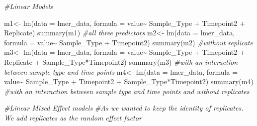 \documentclass[
]{article}
\newenvironment{Shaded}{\begin{snugshade}}{\end{snugshade}}
\newcommand{\AttributeTok}[1]{\textcolor[rgb]{0.77,0.63,0.00}{#1}}
\newcommand{\CommentTok}[1]{\textcolor[rgb]{0.56,0.35,0.01}{\textit{#1}}}
\newcommand{\FunctionTok}[1]{\textcolor[rgb]{0.00,0.00,0.00}{#1}}
\newcommand{\NormalTok}[1]{#1}
\newcommand{\OtherTok}[1]{\textcolor[rgb]{0.56,0.35,0.01}{#1}}
\newcommand{\SpecialCharTok}[1]{\textcolor[rgb]{0.00,0.00,0.00}{#1}}
\begin{document}
\begin{Shaded}
\begin{Highlighting}[]
\CommentTok{\#Linear Models}

\NormalTok{m1}\OtherTok{\textless{}{-}} \FunctionTok{lm}\NormalTok{(}\AttributeTok{data =}\NormalTok{ lmer\_data, }\AttributeTok{formula =}\NormalTok{ value}\SpecialCharTok{\textasciitilde{}}\NormalTok{ Sample\_Type }\SpecialCharTok{+}\NormalTok{ Timepoint2 }\SpecialCharTok{+}\NormalTok{ Replicate)}
\FunctionTok{summary}\NormalTok{(m1)  }\CommentTok{\#all three predictors}
\NormalTok{m2}\OtherTok{\textless{}{-}} \FunctionTok{lm}\NormalTok{(}\AttributeTok{data =}\NormalTok{ lmer\_data, }\AttributeTok{formula =}\NormalTok{ value}\SpecialCharTok{\textasciitilde{}}\NormalTok{ Sample\_Type }\SpecialCharTok{+}\NormalTok{ Timepoint2)}
\FunctionTok{summary}\NormalTok{(m2) }\CommentTok{\#without replicate}
\NormalTok{m3}\OtherTok{\textless{}{-}} \FunctionTok{lm}\NormalTok{(}\AttributeTok{data =}\NormalTok{ lmer\_data, }\AttributeTok{formula =}\NormalTok{ value}\SpecialCharTok{\textasciitilde{}}\NormalTok{ Sample\_Type }\SpecialCharTok{+}\NormalTok{ Timepoint2 }\SpecialCharTok{+}\NormalTok{ Replicate }\SpecialCharTok{+}\NormalTok{ Sample\_Type}\SpecialCharTok{*}\NormalTok{Timepoint2)}
\FunctionTok{summary}\NormalTok{(m3) }\CommentTok{\#with an interaction between sample type and time points}
\NormalTok{m4}\OtherTok{\textless{}{-}} \FunctionTok{lm}\NormalTok{(}\AttributeTok{data =}\NormalTok{ lmer\_data, }\AttributeTok{formula =}\NormalTok{ value}\SpecialCharTok{\textasciitilde{}}\NormalTok{ Sample\_Type }\SpecialCharTok{+}\NormalTok{ Timepoint2 }\SpecialCharTok{+}\NormalTok{  Sample\_Type}\SpecialCharTok{*}\NormalTok{Timepoint2)}
\FunctionTok{summary}\NormalTok{(m4) }\CommentTok{\#with an interaction between sample type and time points and without replicates}

\CommentTok{\#Linear Mixed Effect models}
\CommentTok{\#As we wanted to keep the identity of replicates. We add replicates as the random effect factor}


\end{Highlighting}
\end{Shaded}
\end{document}
